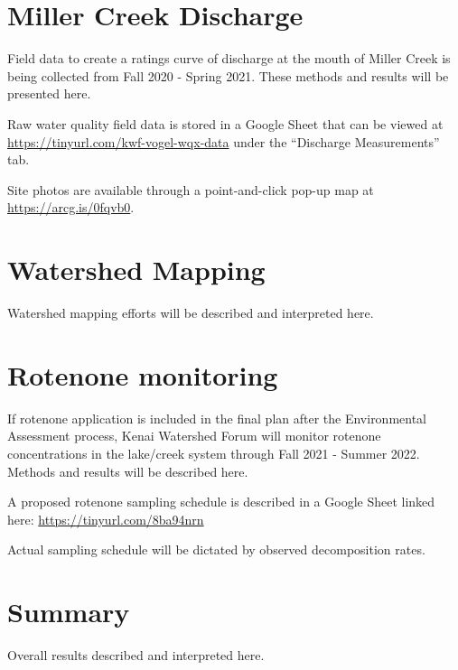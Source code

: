 \documentclass[
]{book}
\begin{document}
\hypertarget{miller-creek-discharge}{%
\chapter{Miller Creek Discharge}\label{miller-creek-discharge}}

Field data to create a ratings curve of discharge at the mouth of Miller Creek is being collected from Fall 2020 - Spring 2021. These methods and results will be presented here.

Raw water quality field data is stored in a Google Sheet that can be viewed at \url{https://tinyurl.com/kwf-vogel-wqx-data} under the ``Discharge Measurements'' tab.

Site photos are available through a point-and-click pop-up map at \url{https://arcg.is/0fqvb0}.

\hypertarget{watershed-mapping}{%
\chapter{Watershed Mapping}\label{watershed-mapping}}

Watershed mapping efforts will be described and interpreted here.

\hypertarget{rotenone-monitoring}{%
\chapter{Rotenone monitoring}\label{rotenone-monitoring}}

If rotenone application is included in the final plan after the Environmental Assessment process, Kenai Watershed Forum will monitor rotenone concentrations in the lake/creek system through Fall 2021 - Summer 2022. Methods and results will be described here.

A proposed rotenone sampling schedule is described in a Google Sheet linked here: \url{https://tinyurl.com/8ba94nrn}

Actual sampling schedule will be dictated by observed decomposition rates.

\hypertarget{summary}{%
\chapter{Summary}\label{summary}}

Overall results described and interpreted here.

  
\end{document}
